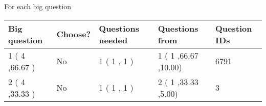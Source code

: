 \documentclass[12pt]{article}
\begin{document}
   
 \newpage
   
{\LARGE{For each big question}}
   
   
\vspace{0.2in}
   
   
\noindent\hspace{-0.4in}\begin{tabular}{|l|l|l|l|l|}
\hline
 Big question & Choose? & Questions needed & Questions from & Question IDs \\ 
\hline
 1 ( 4 ,66.67
 ) &  No   & 
 1 ( 1 ,  1 ) &  1 ( 1
,66.67
 ,10.00) &  6791  \\
 \hline
 2 ( 4 ,33.33
 ) &  No   & 
 1 ( 1 ,  1 ) &  2 ( 1
,33.33
 ,5.00) &  3  \\
 \hline
 \end{tabular}
 
 
\end{document}
